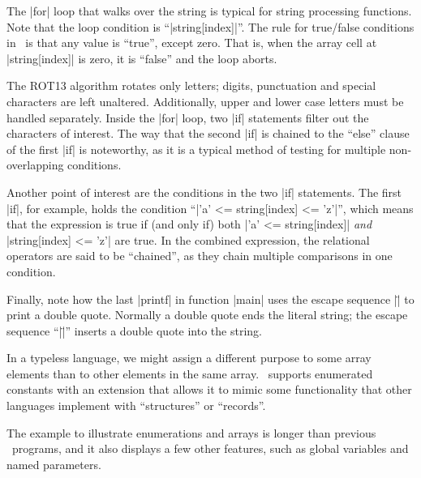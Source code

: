 The |for| loop that walks over the string is typical for string processing
functions. Note that the loop condition is ``|string[index]|''. The rule for
true\slash false conditions in \Small\ is that any value is ``true'', except
zero. That is, when the array cell at |string[index]| is zero, it is ``false''
and the loop aborts.

The ROT13 algorithm rotates only letters; digits, punctuation and special
characters are left unaltered. Additionally, upper and lower case letters must
be handled separately. Inside the |for| loop, two |if| statements filter out
the characters of interest. The way that the second |if| is chained to the
``else'' clause of the first |if| is noteworthy, as it is a typical method of
testing for multiple non-overlapping conditions.

\noindent{}%
Another point of interest are the conditions in the two |if| statements. The
first |if|, for example, holds the condition ``|'a' <= string[index] <= 'z'|'',
which means that the expression is true if (and only if) both |'a' <= string[index]|
{\it and\/} |string[index] <= 'z'| are true. In the combined expression, the
relational operators are said to be ``chained'', as they chain multiple
comparisons in one condition.

\noindent{}
Finally, note how the last |printf| in function |main| uses the escape sequence
|\"| to print a double quote. Normally a double quote ends the literal string;
the escape sequence ``|\"|'' inserts a double quote into the string.


\dingbatseparator


In a typeless language, we might assign a different purpose to some array
elements than to other elements in the same array. \Small\ supports enumerated
constants with an extension
that allows it to mimic some functionality that other languages implement
with ``structures'' or ``records''.

The example to illustrate enumerations and arrays is longer than previous
\Small\ programs, and it also displays a few other features, such as global
variables and named parameters.

